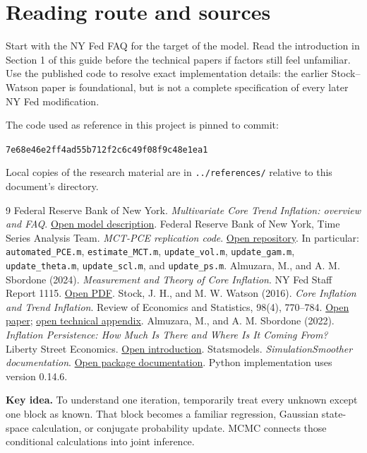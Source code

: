 \documentclass[11pt,a4paper]{article}
\newcommand{\takeaway}[1]{\par\medskip\noindent\colorbox{pale}{\parbox{\dimexpr\linewidth-2\fboxsep}{\textbf{Key idea.} #1}}\par\medskip}
\begin{document}
\newpage
\section{Reading route and sources}
Start with the NY Fed FAQ for the target of the model. Read the introduction in Section 1 of this guide before the technical papers if factors still feel unfamiliar. Use the published code to resolve exact implementation details: the earlier Stock--Watson paper is foundational, but is not a complete specification of every later NY Fed modification.

The code used as reference in this project is pinned to commit:\par
{\small\texttt{7e68e46e2ff4ad55b712f2c6c49f08f9c48e1ea1}}\par
Local copies of the research material are in \texttt{../references/} relative to this document's directory.

\begin{thebibliography}{9}
 Federal Reserve Bank of New York. \emph{Multivariate Core Trend Inflation: overview and FAQ}. \href{https://www.newyorkfed.org/research/policy/mct}{Open model description}.
 Federal Reserve Bank of New York, Time Series Analysis Team. \emph{MCT-PCE replication code}. \href{https://github.com/MCT-Inflation-NYFed/MCT-PCE}{Open repository}. In particular: \texttt{automated\_PCE.m}, \texttt{estimate\_MCT.m}, \texttt{update\_vol.m}, \texttt{update\_gam.m}, \texttt{update\_theta.m}, \texttt{update\_scl.m}, and \texttt{update\_ps.m}.
 Almuzara, M., and A. M. Sbordone (2024). \emph{Measurement and Theory of Core Inflation}. NY Fed Staff Report 1115. \href{https://www.newyorkfed.org/medialibrary/media/research/staff_reports/sr1115.pdf}{Open PDF}.
 Stock, J. H., and M. W. Watson (2016). \emph{Core Inflation and Trend Inflation}. Review of Economics and Statistics, 98(4), 770--784. \href{https://www.princeton.edu/~mwatson/papers/core_and_trend_inflation_restat_2016.pdf}{Open paper}; \href{https://www.princeton.edu/~mwatson/papers/core_and_trend_inflation_online_appendix_20151103.pdf}{open technical appendix}.
 Almuzara, M., and A. M. Sbordone (2022). \emph{Inflation Persistence: How Much Is There and Where Is It Coming From?} Liberty Street Economics. \href{https://libertystreeteconomics.newyorkfed.org/2022/04/inflation-persistence-how-much-is-there-and-where-is-it-coming-from/}{Open introduction}.
 Statsmodels. \emph{SimulationSmoother documentation}. \href{https://www.statsmodels.org/stable/generated/statsmodels.tsa.statespace.simulation_smoother.SimulationSmoother.html}{Open package documentation}. Python implementation uses version 0.14.6.
\end{thebibliography}

\takeaway{To understand one iteration, temporarily treat every unknown except one block as known. That block becomes a familiar regression, Gaussian state-space calculation, or conjugate probability update. MCMC connects those conditional calculations into joint inference.}
\end{document}
